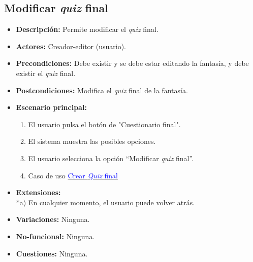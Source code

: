 \subsection{Modificar \textit{quiz} final}
\begin{itemize}
	\item \textbf{Descripción:} Permite modificar el \textit{quiz} final.
	\item \textbf{Actores:} Creador-editor (usuario).
	\item \textbf{Precondiciones:} Debe existir y se debe estar editando la fantasía, y debe existir el \textit{quiz} final.
	\item \textbf{Postcondiciones:} Modifica el \textit{quiz} final de la fantasía.
	\item \textbf{Escenario principal:}
	\begin{enumerate}
		\item El usuario pulsa el botón de "Cuestionario final".
		\item El sistema muestra las posibles opciones.
		\item El usuario selecciona la opción ``Modificar \textit{quiz} final''.
		\item Caso de uso \hyperlink{crearquizfinal}{\textcolor{blue}{Crear \textit{Quiz} final}}
	\end{enumerate}
	\item \textbf{Extensiones:} \\ *a) En cualquier momento, el usuario puede volver atrás.
	\item \textbf{Variaciones:} Ninguna.
	\item \textbf{No-funcional:} Ninguna.
	\item \textbf{Cuestiones:} Ninguna.
\end{itemize}

